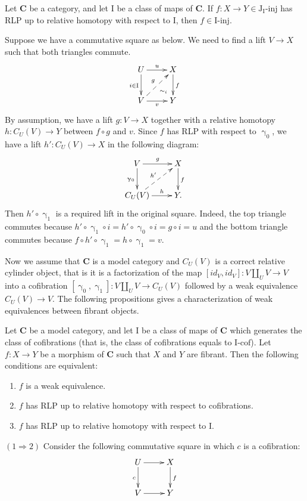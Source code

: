 \documentclass{tac}
\theoremstyle{definition}
\newcommand{\cat}[1]{\mathbf{#1}}
\newcommand{\C}{\cat{C}}
\newcommand{\I}{\mathrm{I}}
\newcommand{\J}{\mathrm{J}}
\newcommand{\class}[2]{#1\text{-}\mathrm{#2}}
\newcommand{\Iinj}[1][\I]{\class{#1}{inj}}
\newcommand{\Icof}[1][\I]{\class{#1}{cof}}
\newcommand{\Jinj}[1][]{\Iinj[\J#1]}
\newcommand{\cyli}{\upgamma}
\begin{document}
\begin{prop}
Let $\C$ be a category, and let $\I$ be a class of maps of $\C$.
If $f : X \to Y \in \Jinj[_\I]$ has RLP up to relative homotopy with respect to $\I$, then $f \in \Iinj$.
\end{prop}
\proof
Suppose we have a commutative square as below.
We need to find a lift $V \to X$ such that both triangles commute.
\[ \xymatrix{ U \ar[d]_{i \in \I} \ar[r]^u \ar@{}[dr]|(.7){\sim_i} & X \ar[d]^f \\
              V \ar[r]_v \ar@{-->}[ur]^g                           & Y
            } \]
By assumption, we have a lift $g : V \to X$ together with a relative homotopy $h : C_U(V) \to Y$ between $f \circ g$ and $v$.
Since $f$ has RLP with respect to $\cyli_0$, we have a lift $h' : C_U(V) \to X$ in the following diagram:
\[ \xymatrix{ V \ar[r]^g \ar[d]_{\cyli_0}         & X \ar[d]^f \\
              C_U(V) \ar[r]^-h \ar@{-->}[ur]^{h'} & Y.
            } \]
Then $h' \circ \cyli_1$ is a required lift in the original square.
Indeed, the top triangle commutes because $h' \circ \cyli_1 \circ i = h' \circ \cyli_0 \circ i = g \circ i = u$ and the bottom triangle commutes because $f \circ h' \circ \cyli_1 = h \circ \cyli_1 = v$.
\endproof

Now we assume that $\C$ is a model category and $C_U(V)$ is a correct relative cylinder object, that is it is a factorization of the map $[id_V,id_V] : V \amalg_U V \to V$
into a cofibration $[\cyli_0,\cyli_1] : V \amalg_U V \to C_U(V)$ followed by a weak equivalence $C_U(V) \to V$.
The following propositions gives a characterization of weak equivalences between fibrant objects.

\begin{prop}[min-we]
Let $\C$ be a model category, and let $\I$ be a class of maps of $\C$ which generates the class of cofibrations (that is, the class of cofibrations equals to $\Icof$).
Let $f : X \to Y$ be a morphism of $\C$ such that $X$ and $Y$ are fibrant.
Then the following conditions are equivalent:
\begin{enumerate}
\item $f$ is a weak equivalence.
\item $f$ has RLP up to relative homotopy with respect to cofibrations.
\item $f$ has RLP up to relative homotopy with respect to $\I$.
\end{enumerate}
\end{prop}
\proof
$(1 \Rightarrow 2)$
Consider the following commutative square in which $c$ is a cofibration:
\[ \xymatrix{ U \ar[r] \ar[d]_c & X \ar[d]^f \\
              V \ar[r]          & Y
            } \]
\end{document}

